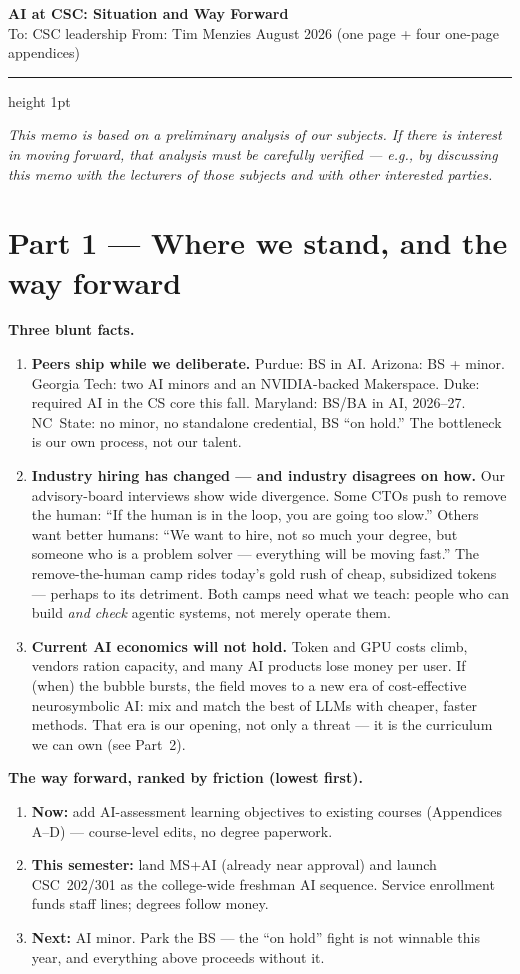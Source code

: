 \documentclass[10pt]{article}
\begin{document}
{\large\bfseries AI at CSC: Situation and Way Forward}\\[1pt]
{\small To: CSC leadership \quad From: Tim Menzies \quad August 2026 \quad (one page + four one-page appendices)}

\vspace{2pt}\textcolor{rule}{\hrule height 1pt}

{\small\emph{This memo is based on a preliminary analysis of our subjects. If there is interest in moving forward, that analysis must be carefully verified --- e.g., by discussing this memo with the lecturers of those subjects and with other interested parties.}}

\section{Part 1 --- Where we stand, and the way forward}

\textbf{Three blunt facts.}
\begin{enumerate}
\item \textbf{Peers ship while we deliberate.} Purdue: BS in AI. Arizona: BS + minor. Georgia Tech: two AI minors and an NVIDIA-backed Makerspace. Duke: required AI in the CS core this fall. Maryland: BS/BA in AI, 2026--27. NC~State: no minor, no standalone credential, BS ``on hold.'' The bottleneck is our own process, not our talent.
\item \textbf{Industry hiring has changed --- and industry disagrees on how.} Our advisory-board interviews show wide divergence. Some CTOs push to remove the human: ``If the human is in the loop, you are going too slow.'' Others want better humans: ``We want to hire, not so much your degree, but someone who is a problem solver --- everything will be moving fast.'' The remove-the-human camp rides today's gold rush of cheap, subsidized tokens --- perhaps to its detriment. Both camps need what we teach: people who can build \emph{and check} agentic systems, not merely operate them.
\item \textbf{Current AI economics will not hold.} Token and GPU costs climb, vendors ration capacity, and many AI products lose money per user. If (when) the bubble bursts, the field moves to a new era of cost-effective neurosymbolic AI: mix and match the best of LLMs with cheaper, faster methods. That era is our opening, not only a threat --- it is the curriculum we can own (see Part~2).
\end{enumerate}

\textbf{The way forward, ranked by friction (lowest first).}
\begin{enumerate}
\item \textbf{Now:} add AI-assessment learning objectives to existing courses (Appendices A--D) --- course-level edits, no degree paperwork.
\item \textbf{This semester:} land MS+AI (already near approval) and launch CSC~202/301 as the college-wide freshman AI sequence. Service enrollment funds staff lines; degrees follow money.
\item \textbf{Next:} AI minor. Park the BS --- the ``on hold'' fight is not winnable this year, and everything above proceeds without it.
\end{enumerate}
\end{document}
